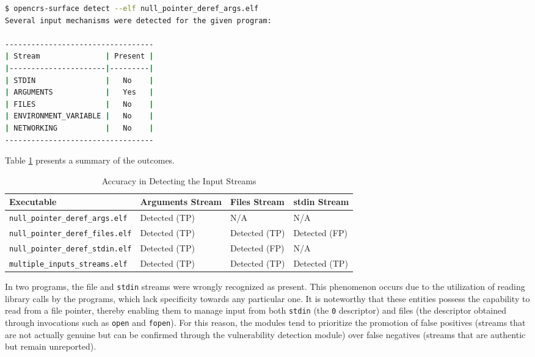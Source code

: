 \documentclass[../main.tex]{subfiles}
\begin{document}
\begin{lstlisting}[captionpos=b,basicstyle=\tiny,language=Bash, caption=Example of Approximating the Attack Surface]
$ opencrs-surface detect --elf null_pointer_deref_args.elf
Several input mechanisms were detected for the given program:

----------------------------------
| Stream               | Present |
|----------------------|---------|
| STDIN                |   No    |
| ARGUMENTS            |   Yes   |
| FILES                |   No    |
| ENVIRONMENT_VARIABLE |   No    |
| NETWORKING           |   No    |
----------------------------------
\end{lstlisting}

Table \ref{executables-distribution} presents a summary of the outcomes.

\begin{table}[]
  \centering
  \begin{tabular}{|l|l|l|l|}
    \hline
    Executable                               & Arguments Stream & Files Stream  & stdin Stream  \\ \hline
    \texttt{null\_pointer\_deref\_args.elf}  & Detected (TP)    & N/A           & N/A           \\ \hline
    \texttt{null\_pointer\_deref\_files.elf} & Detected (TP)    & Detected (TP) & Detected (FP) \\ \hline
    \texttt{null\_pointer\_deref\_stdin.elf} & Detected (TP)    & Detected (FP) & N/A           \\ \hline
    \texttt{multiple\_inputs\_streams.elf}   & Detected (TP)    & Detected (TP) & Detected (TP) \\ \hline
  \end{tabular}
  \caption{\label{executables-distribution}Accuracy in Detecting the Input Streams}
\end{table}

In two programs, the file and \texttt{stdin} streams were wrongly recognized as
present. This phenomenon occurs due to the utilization of reading library calls
by the programs, which lack specificity towards any particular one. It is
noteworthy that these entities possess the capability to read from a file
pointer, thereby enabling them to manage input from both \texttt{stdin} (the
\texttt{0} descriptor) and files (the descriptor obtained through invocations
such as \texttt{open} and \texttt{fopen}). For this reason, the modules tend to
prioritize the promotion of false positives (streams that are not actually
genuine but can be confirmed through the vulnerability detection module) over
false negatives (streams that are authentic but remain unreported).
\end{document}
